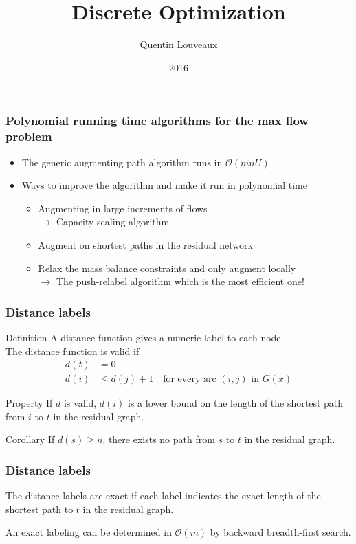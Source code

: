 \documentclass[9pt]{beamer}
\title{Discrete Optimization}
\author{Quentin
Louveaux}
\institute{ULg - Institut Montefiore}
\date{2016}
\begin{document}
\begin{frame}
  \titlepage
\end{frame}
\begin{frame}
\frametitle{Polynomial running time algorithms for the max flow problem}
\begin{itemize}
\item<1-> The generic augmenting path algorithm runs in $\mathcal O(mnU)$\bigskip
\item<1-> Ways to improve the algorithm and make it run in polynomial time\medskip
\begin{itemize}
\item<1-> Augmenting in \alert{large } increments of flows\\
$\rightarrow$ \alert{Capacity scaling} algorithm\medskip
\item<1-> Augment on \alert{shortest paths} in the residual network\medskip
\item<1-> Relax the \alert{mass balance constraints} and only augment \alert{locally}\\
$\rightarrow$ The \alert{push-relabel} algorithm which is the most efficient one!
\end{itemize}
\end{itemize}
\end{frame}
\begin{frame}
\frametitle{Distance labels}
\begin{block}{Definition}
A distance function gives a \alert{numeric label} to each node.\\
The distance function is \alert{valid} if
\begin{align*}
d(t)&=0\\
d(i)&\leq d(j)+1\quad \text{for every arc }(i,j)\text{ in } G(x)
\end{align*}
\end{block}
\begin{block}{Property}
If $d$ is valid, $d(i)$ is a \alert{lower bound} on the length
of the shortest path from $i$ to $t$ in the \alert{residual graph}.
\end{block}
\begin{block}{Corollary}
If $d(s)\geq n$, there exists no path from $s$ to $t$
in the residual graph.
\end{block}
\end{frame}
\begin{frame}
\frametitle{Distance labels}
The distance labels are \alert{exact} if each label
indicates the \alert{exact length} of the shortest path to $t$
in the residual graph.\medskip

\noindent
An exact labeling can be determined in $\mathcal O(m)$ by \alert{backward breadth-first
search}.\medskip


\end{frame}
\end{document}
